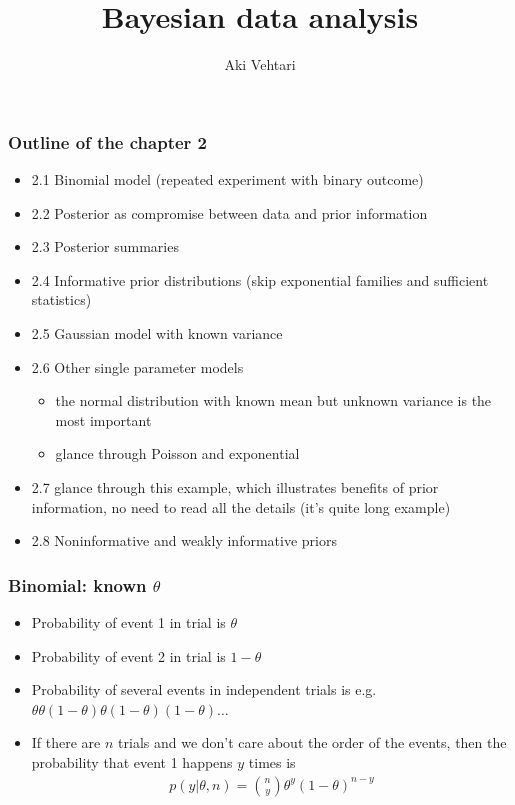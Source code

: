 \documentclass[english,t]{beamer}
\title[]{Bayesian data analysis}
\subtitle{}
\author{Aki Vehtari}
\institute[  Aalto]{}
\begin{document}
 

 \begin{frame}

   \frametitle{Outline of the chapter 2}

  \begin{itemize}
\item 2.1 Binomial model (repeated experiment with binary outcome)
\item 2.2 Posterior as compromise between data and prior information
\item 2.3 Posterior summaries
\item 2.4 Informative prior distributions (skip exponential families and sufficient statistics)
\item 2.5 Gaussian model with known variance
\item 2.6 Other single parameter models
  \begin{itemize}
  \item the normal distribution with known mean but
    unknown variance is the most important
  \item glance through Poisson and exponential
  \end{itemize}
\item 2.7 glance through this example, which illustrates benefits of prior information, no need to read all the details (it's quite long example)
\item 2.8 Noninformative and weakly informative priors
\end{itemize}

\end{frame}


\begin{frame}
  \frametitle{Binomial: known $\theta$}

  \begin{itemize}
  \item Probability of event 1 in trial is $\theta$
  \item<2-> Probability of event 2 in trial is $1-\theta$
  \item<3-> Probability of several events in independent trials is e.g.\\
    $\theta\theta(1-\theta)\theta(1-\theta)(1-\theta)\ldots$
  \item<4-> If there are $n$ trials and we don't care about the order
    of the events, then the probability that event 1 happens $y$ times
    is
    \begin{align*}
      p(y|\theta,n) = \binom{n}{y} \theta^y(1-\theta)^{n-y}
    \end{align*}
  \end{itemize}

\end{frame}
\end{document}
